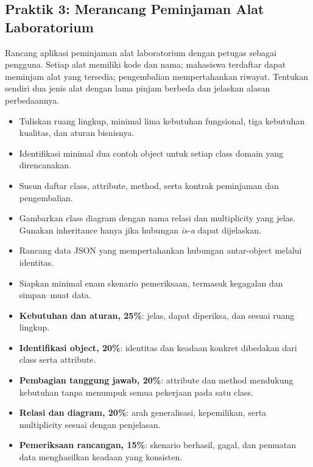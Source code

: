 \subsection{Praktik 3: Merancang Peminjaman Alat Laboratorium}

Rancang aplikasi peminjaman alat laboratorium dengan petugas sebagai pengguna. Setiap alat memiliki kode dan nama; mahasiswa terdaftar dapat meminjam alat yang tersedia; pengembalian mempertahankan riwayat. Tentukan sendiri dua jenis alat dengan lama pinjam berbeda dan jelaskan alasan perbedaannya.

\begin{itemize}
  \item Tuliskan ruang lingkup, minimal lima kebutuhan fungsional, tiga kebutuhan kualitas, dan aturan bisnisnya.
  \item Identifikasi minimal dua contoh object untuk setiap class domain yang direncanakan.
  \item Susun daftar class, attribute, method, serta kontrak peminjaman dan pengembalian.
  \item Gambarkan class diagram dengan nama relasi dan multiplicity yang jelas. Gunakan inheritance hanya jika hubungan \emph{is-a} dapat dijelaskan.
  \item Rancang data JSON yang mempertahankan hubungan antar-object melalui identitas.
  \item Siapkan minimal enam skenario pemeriksaan, termasuk kegagalan dan simpan--muat data.
\end{itemize}

\begin{penting}
\begin{itemize}
  \item \textbf{Kebutuhan dan aturan, 25\%}: jelas, dapat diperiksa, dan sesuai ruang lingkup.
  \item \textbf{Identifikasi object, 20\%}: identitas dan keadaan konkret dibedakan dari class serta attribute.
  \item \textbf{Pembagian tanggung jawab, 20\%}: attribute dan method mendukung kebutuhan tanpa menumpuk semua pekerjaan pada satu class.
  \item \textbf{Relasi dan diagram, 20\%}: arah generalisasi, kepemilikan, serta multiplicity sesuai dengan penjelasan.
  \item \textbf{Pemeriksaan rancangan, 15\%}: skenario berhasil, gagal, dan pemuatan data menghasilkan keadaan yang konsisten.
\end{itemize}
\end{penting}
\endgroup
